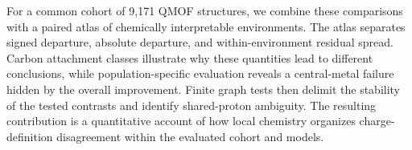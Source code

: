 For a common cohort of 9,171 QMOF structures, we combine these comparisons with a paired atlas of chemically interpretable environments. The atlas separates signed departure, absolute departure, and within-environment residual spread. Carbon attachment classes illustrate why these quantities lead to different conclusions, while population-specific evaluation reveals a central-metal failure hidden by the overall improvement. Finite graph tests then delimit the stability of the tested contrasts and identify shared-proton ambiguity. The resulting contribution is a quantitative account of how local chemistry organizes charge-definition disagreement within the evaluated cohort and models.
